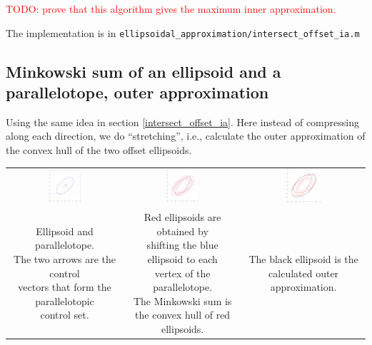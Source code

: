 \documentclass{article}
\begin{document}
\textcolor{red}{TODO: prove that this algorithm gives the maximum inner approximation. }

The implementation is in \texttt{ellipsoidal\_approximation/intersect\_offset\_ia.m}


\subsection{Minkowski sum of an ellipsoid and a parallelotope, outer approximation}
Using the same idea in section \ref{intersect_offset_ia}. Here instead of compressing along each direction, we do ``stretching'', i.e., calculate the outer approximation of the convex hull of the two offset ellipsoids.

\begin{table}[h!]
	\centering
	\begin{tabular}{ccc}
		\includegraphics[width=0.3\textwidth]{union_offset_oa/1.pdf} & \includegraphics[width=0.3\textwidth]{union_offset_oa/2.pdf} & 
		\includegraphics[width=0.3\textwidth]{union_offset_oa/9.pdf}\\
		\makecell{Ellipsoid and parallelotope. \\ The two arrows are the control \\ vectors that form the parallelotopic \\ control set.}& \makecell{Red ellipsoids are obtained by \\ shifting the blue ellipsoid to each \\ vertex of the parallelotope.\\ The Minkowski sum is \\the convex hull of red ellipsoids.} & \makecell{The black ellipsoid is the\\ calculated outer approximation.}
	\end{tabular}
	\label{union_offset_oa1}
\end{table}
\end{document}

